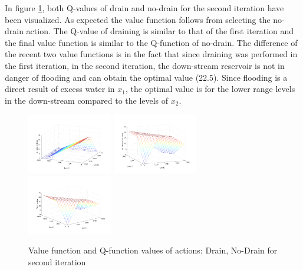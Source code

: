 In figure \ref{fig:v2plots}, both Q-values of drain and no-drain for the second iteration have been visualized. As expected the value function follows from selecting the no-drain action. The Q-value of draining is similar to that of the first iteration and the final value function is similar to the Q-function of no-drain. The difference of the recent two value functions is in the fact that since draining was performed in the first iteration, in the second iteration, the down-stream reservoir is not in danger of flooding and can obtain the optimal value (22.5). Since flooding is a direct result of excess water in $x_1$, the optimal value is for the lower range levels in the down-stream compared to the levels of $x_2$. 
\begin{figure}[t]
\centering
\includegraphics[width=0.33\textwidth]{Figures1/reservoir/Q2-Drain.pdf}
\includegraphics[width=0.33\textwidth]{Figures1/reservoir/Q2-noDrain.pdf}
\includegraphics[width=0.33\textwidth]{Figures1/reservoir/v2plot.pdf}
\caption{%
Value function and Q-function values of actions: Drain, No-Drain for second iteration
}
\label{fig:v2plots}
\end{figure}

